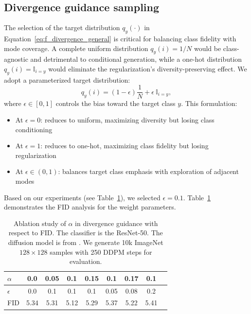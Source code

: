 \documentclass{article}
\begin{document}
\subsection{Divergence guidance sampling } \label{addexdiv}
The selection of the target distribution $q_y(\cdot)$ in Equation~\eqref{eq:f_divergence_general} is critical for balancing class fidelity with mode coverage. A complete uniform distribution $q_y(i) = 1/N$ would be class-agnostic and detrimental to conditional generation, while a one-hot distribution $q_y(i) = \mathbb{I}_{i=y}$ would eliminate the regularization's diversity-preserving effect. We adopt a parameterized target distribution:
\begin{equation}
q_y(i) = (1-\epsilon)\frac{1}{N} + \epsilon \:\mathbb{I}_{i=y},
\label{eq:target_distribution}
\end{equation}
where $\epsilon \in [0, 1]$ controls the bias toward the target class $y$. This formulation:
\begin{itemize}
    \item At $\epsilon = 0$: reduces to uniform, maximizing diversity but losing class conditioning
    \item At $\epsilon = 1$: reduces to one-hot, maximizing class fidelity but losing regularization
    \item At $\epsilon \in (0, 1)$: balances target class emphasis with exploration of adjacent modes
\end{itemize}
Based on our experiments (see Table~\ref{tab:fid_alpha}), we selected $\epsilon = 0.1$. Table~\ref{tab:fid_alpha} demonstrates the FID analysis for the weight parameters.   
\begin{table}[h]
  \centering
  \caption{ Ablation study of $\alpha$ in divergence guidance with respect to FID. The classifier is the
ResNet-50. The diffusion model is from \cite{dhariwal2021diffusion}. We generate 10k
ImageNet $128\times128$ samples with 250 DDPM steps for evaluation.}
\vspace{5pt}
  \label{tab:fid_alpha}
  \begin{tabular}{lcccccccc}
    \toprule
    $\alpha$ & 0.0 & 0.05 & 0.1 & 0.15 & 0.1 & 0.17&0.1\\
    \midrule
        $\epsilon$ & 0.0 & 0.1 & 0.1 & 0.1 & 0.05 & 0.08&0.2\\
    \midrule
    FID      & 5.34 & 5.31 & 5.12 & 5.29 & 5.37 & 5.22&5.41\\
    \bottomrule
  \end{tabular}
\end{table}
\end{document}
